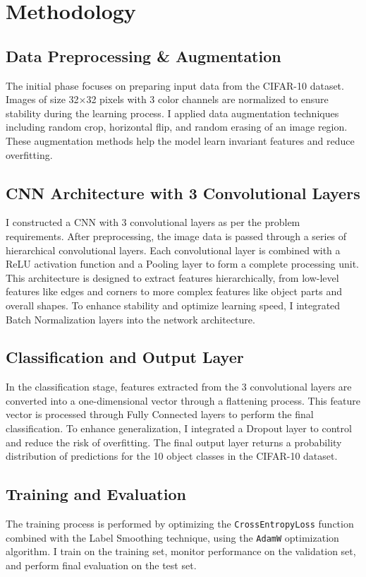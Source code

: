 \documentclass[12pt, a4paper, openany]{report}
\begin{document}
 \chapter{Methodology} %
 \section{Data Preprocessing \& Augmentation} %
 The initial phase focuses on preparing input data from the CIFAR-10 dataset. Images of size 32×32 pixels with 3 color channels are normalized to ensure stability during the learning process. I applied data augmentation techniques including random crop, horizontal flip, and random erasing of an image region. These augmentation methods help the model learn invariant features and reduce overfitting. %

 \section{CNN Architecture with 3 Convolutional Layers} %
 I constructed a CNN with 3 convolutional layers as per the problem requirements. After preprocessing, the image data is passed through a series of hierarchical convolutional layers. Each convolutional layer is combined with a ReLU activation function and a Pooling layer to form a complete processing unit. This architecture is designed to extract features hierarchically, from low-level features like edges and corners to more complex features like object parts and overall shapes. To enhance stability and optimize learning speed, I integrated Batch Normalization layers into the network architecture. %

 \section{Classification and Output Layer} %
 In the classification stage, features extracted from the 3 convolutional layers are converted into a one-dimensional vector through a flattening process. This feature vector is processed through Fully Connected layers to perform the final classification. To enhance generalization, I integrated a Dropout layer to control and reduce the risk of overfitting. The final output layer returns a probability distribution of predictions for the 10 object classes in the CIFAR-10 dataset. %

 \section{Training and Evaluation} %
 The training process is performed by optimizing the \texttt{CrossEntropyLoss} function combined with the Label Smoothing technique, using the \texttt{AdamW} optimization algorithm. I train on the training set, monitor performance on the validation set, and perform final evaluation on the test set. %
\end{document}
